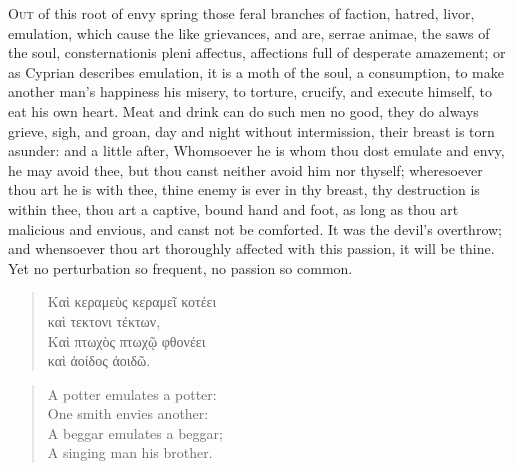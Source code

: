 {{\lettrine{O}{ut} of this root of envy spring those feral branches of faction,
hatred, livor, emulation, which cause the like grievances, and are,
serrae animae, the saws of the soul, consternationis pleni
affectus, affections full of desperate amazement; or as Cyprian
describes emulation, it is a moth of the soul, a consumption, to
make another man's happiness his misery, to torture, crucify, and
execute himself, to eat his own heart. Meat and drink can do such men
no good, they do always grieve, sigh, and groan, day and night without
intermission, their breast is torn asunder: and a little after,
Whomsoever he is whom thou dost emulate and envy, he may avoid
thee, but thou canst neither avoid him nor thyself; wheresoever thou
art he is with thee, thine enemy is ever in thy breast, thy destruction
is within thee, thou art a captive, bound hand and foot, as long as
thou art malicious and envious, and canst not be comforted. It was the
devil's overthrow; and whensoever thou art thoroughly affected with
this passion, it will be thine. Yet no perturbation so frequent, no
passion so common.
%
\begin{verse}
\textgreek[variant=ancient]{Καὶ κεραμεὺς κεραμεῖ κοτέει\\
καὶ τεκτονι τέκτων},\\
\textgreek[variant=ancient]{Καὶ πτωχὸς πτωχῷ φθονέει\\
καὶ ἀοίδος ἀοιδῶ.}
\end{verse}
\translationrule
\begin{verse}
A potter emulates a potter:\\
One smith envies another:\\

A beggar emulates a beggar;\\
A singing man his brother.\\
\end{verse}

}}
